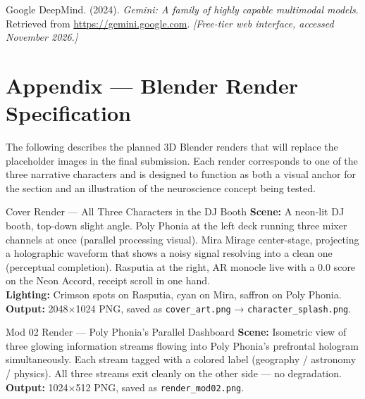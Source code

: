 \documentclass[12pt, a4paper]{article}
\begin{document}
\begin{enumerate}[leftmargin=0.4in, label={[\arabic*]}, resume]

\item Google DeepMind. (2024). \textit{Gemini: A family of highly capable multimodal models}. Retrieved from \url{https://gemini.google.com}. \textit{[Free-tier web interface, accessed November 2026.]}

\end{enumerate}

\newpage

\section{Appendix — Blender Render Specification}

The following describes the planned 3D Blender renders that will replace the placeholder images in the final submission. Each render corresponds to one of the three narrative characters and is designed to function as both a visual anchor for the section and an illustration of the neuroscience concept being tested.

\begin{auditbox}{Cover Render — All Three Characters in the DJ Booth}
\textbf{Scene:} A neon-lit DJ booth, top-down slight angle. Poly Phonia at the left deck running three mixer channels at once (parallel processing visual). Mira Mirage center-stage, projecting a holographic waveform that shows a noisy signal resolving into a clean one (perceptual completion). Rasputia at the right, AR monocle live with a 0.0 score on the Neon Accord, receipt scroll in one hand.\\
\textbf{Lighting:} Crimson spots on Rasputia, cyan on Mira, saffron on Poly Phonia.\\
\textbf{Output:} 2048×1024 PNG, saved as \texttt{cover\_art.png} → \texttt{character\_splash.png}.
\end{auditbox}

\begin{auditbox}{Mod 02 Render — Poly Phonia's Parallel Dashboard}
\textbf{Scene:} Isometric view of three glowing information streams flowing into Poly Phonia's prefrontal hologram simultaneously. Each stream tagged with a colored label (geography / astronomy / physics). All three streams exit cleanly on the other side — no degradation.\\
\textbf{Output:} 1024×512 PNG, saved as \texttt{render\_mod02.png}.
\end{auditbox}
\end{document}
